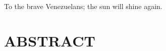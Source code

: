 \documentclass[hidelinks,green,onecolumn,twoside]{dissertation}
\begin{document}
\begin{dedication}
To the brave Venezuelans; the sun will shine again.


\end{dedication}{}


\setlength{\parindent}{0.9em}
\cleardoublepage
{}
{}
\section*{ABSTRACT}
\normalfont

\end{document}
